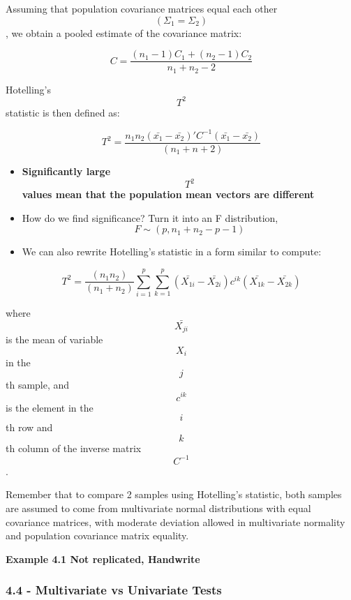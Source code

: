 \documentclass[]{article}
\providecommand{\tightlist}{%
  \setlength{\itemsep}{0pt}\setlength{\parskip}{0pt}}
\begin{document}
Assuming that population covariance matrices equal each other
\[(\Sigma_1 = \Sigma_2)\], we obtain a pooled estimate of the covariance
matrix:

\[C = \frac{(n_1 - 1)C_1 + (n_2 - 1)C_2}{n_1 + n_2 - 2}\]

Hotelling's \[T^2\] statistic is then defined as:

\[T^2 = \frac{n_1 n_2(\bar{x_1} - \bar{x_2})'C^{-1}(\bar{x_1} - \bar{x_2})} {(n_1 + n+2)}\]

\begin{itemize}
\tightlist
\item
  \textbf{Significantly large} \[T^2\] \textbf{values mean that the
  population mean vectors are different}
\item
  How do we find significance? Turn it into an F distribution,
  \[F \sim (p, n_1 + n_2 - p - 1)\]
\item
  We can also rewrite Hotelling's statistic in a form similar to
  compute:
\end{itemize}

\[T^2 = \frac{(n_1 n_2)}{(n_1 + n_2)} \sum_{i = 1}^p \sum_{k = 1}^p (\bar{X_{1i}} - \bar{X_{2i}}) c^{ik} (\bar{X_{1k}} - \bar{X_{2k}})\]

where \[ \bar{X_{ji}} \] is the mean of variable \[ X_i \] in the
\[j\]th sample, and \[ c^{ik} \] is the element in the \[i\]th row and
\[k\]th column of the inverse matrix \[ C^{-1} \].

Remember that to compare 2 samples using Hotelling's statistic, both
samples are assumed to come from multivariate normal distributions with
equal covariance matrices, with moderate deviation allowed in
multivariate normality and population covariance matrix equality.

\textbf{Example 4.1 Not replicated, Handwrite}

\hypertarget{multivariate-vs-univariate-tests}{%
\subsubsection{4.4 - Multivariate vs Univariate
Tests}\label{multivariate-vs-univariate-tests}}
\end{document}

